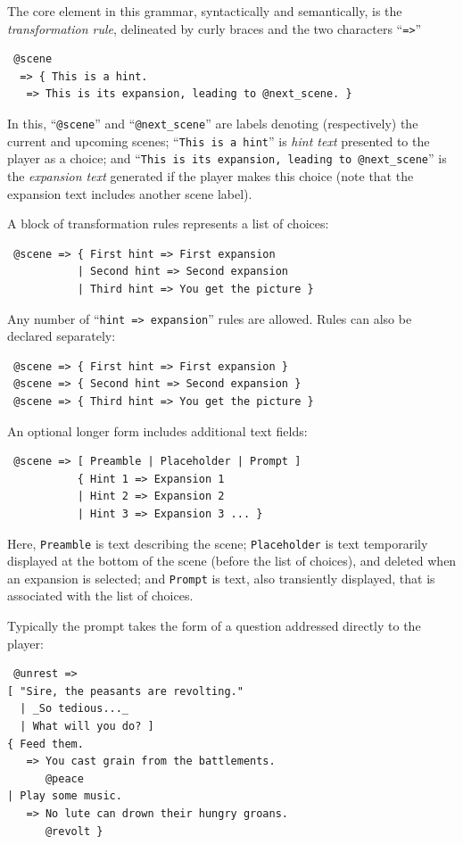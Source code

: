 \documentclass{acm_proc_article-sp}
\begin{document}
The core element in this grammar, syntactically and semantically, is the {\em transformation rule},
delineated by curly braces and the two characters ``{\tt =>}''
\begin{verbatim}
 @scene
  => { This is a hint.
   => This is its expansion, leading to @next_scene. }
\end{verbatim}
In this, ``{\tt @scene}'' and ``{\tt @next\_scene}'' are labels denoting (respectively) the current and upcoming scenes;
``{\tt This is a hint}'' is {\em hint text} presented to the player as a choice;
and ``{\tt This is its expansion, leading to @next\_scene}'' is the {\em expansion text} generated if the player makes this choice
(note that the expansion text includes another scene label).

A block of transformation rules represents a list of choices:
\begin{verbatim}
 @scene => { First hint => First expansion
           | Second hint => Second expansion
           | Third hint => You get the picture }
\end{verbatim}
Any number of ``{\tt hint => expansion}'' rules are allowed.
Rules can also be declared separately:
\begin{verbatim}
 @scene => { First hint => First expansion }
 @scene => { Second hint => Second expansion }
 @scene => { Third hint => You get the picture }
\end{verbatim}

An optional longer form includes additional text fields:
\begin{verbatim}
 @scene => [ Preamble | Placeholder | Prompt ]
           { Hint 1 => Expansion 1
           | Hint 2 => Expansion 2
           | Hint 3 => Expansion 3 ... }
\end{verbatim}

Here, {\tt Preamble} is text describing the scene;
{\tt Placeholder} is text temporarily displayed at the bottom of the scene (before the list of choices),
and deleted when an expansion is selected;
and {\tt Prompt} is text, also transiently displayed, that is associated with the list of choices.

Typically the prompt takes the form of a question addressed directly to the player:
\begin{verbatim}
 @unrest =>
[ "Sire, the peasants are revolting."
  | _So tedious..._ 
  | What will you do? ] 
{ Feed them.
   => You cast grain from the battlements.
      @peace
| Play some music.
   => No lute can drown their hungry groans.
      @revolt }
\end{verbatim}
\end{document}
